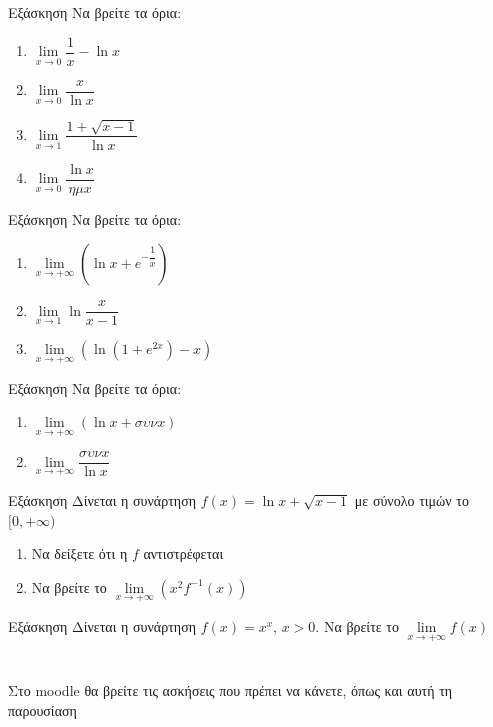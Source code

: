 \documentclass[greek]{beamer}
\begin{document}
\begin{frame}{Εξάσκηση}
      Να βρείτε τα όρια:
      \begin{enumerate}
            \item $\lim\limits_{x \to 0}{ \dfrac{1}{x}-\ln x }$ \pause
            \item $\lim\limits_{x \to 0}{ \dfrac{x}{\ln x} }$\pause
            \item $\lim\limits_{x \to 1}{ \dfrac{1+\sqrt{x-1}}{\ln x}}$\pause
            \item $\lim\limits_{x \to 0}{ \dfrac{\ln x}{ημx}}$
      \end{enumerate}
\end{frame}

\begin{frame}{Εξάσκηση}
      Να βρείτε τα όρια:
      \begin{enumerate}
            \item $\lim\limits_{x \to +\infty}{\left(    \ln x + e^{-\dfrac{1}{x}} \right)}$ \pause
            \item $\lim\limits_{x \to 1}{ \ln\dfrac{x}{x-1} }$\pause
            \item $\lim\limits_{x \to +\infty}{\left( \ln (1+e^{2x})-x \right)}$
      \end{enumerate}
\end{frame}

\begin{frame}{Εξάσκηση}
      Να βρείτε τα όρια:
      \begin{enumerate}
            \item $\lim\limits_{x \to +\infty}{\left( \ln x+συνx \right)}$ \pause
            \item $\lim\limits_{x \to +\infty}{ \dfrac{συνx}{\ln x} }$
      \end{enumerate}
\end{frame}

\begin{frame}{Εξάσκηση}
      Δίνεται η συνάρτηση $f(x)=\ln x + \sqrt{x-1}$ με σύνολο τιμών το $[0,+\infty)$
      \begin{enumerate}
            \item Να δείξετε ότι η $f$ αντιστρέφεται \pause
            \item Να βρείτε το $\lim\limits_{x \to +\infty}{ \left( x^2f^{-1}(x) \right)  }$
      \end{enumerate}
\end{frame}

\begin{frame}{Εξάσκηση}
      Δίνεται η συνάρτηση $f(x)=x^x$, $x>0$. Να βρείτε το $\lim\limits_{x \to +\infty}{ f(x)  }$
\end{frame}

\section{}
\begin{frame}
      Στο moodle θα βρείτε τις ασκήσεις που πρέπει να κάνετε, όπως και αυτή τη παρουσίαση
\end{frame}
\end{document}
